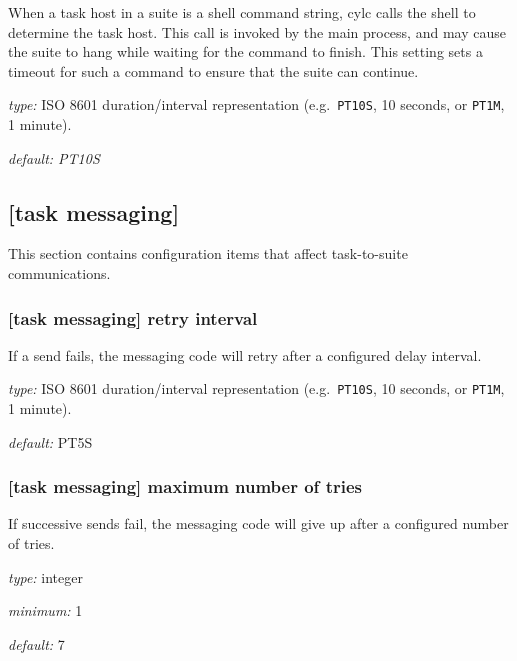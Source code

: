 When a task host in a suite is a shell command string, cylc calls the shell to
determine the task host. This call is invoked by the main process, and may
cause the suite to hang while waiting for the command to finish. This setting
sets a timeout for such a command to ensure that the suite can continue.

\begin{myitemize}
\item {\em type:} ISO 8601 duration/interval representation (e.g.\ 
\lstinline=PT10S=, 10 seconds, or \lstinline=PT1M=, 1 minute).
\item {\em default: PT10S}
\end{myitemize}

\subsection{[task messaging]}

This section contains configuration items that affect task-to-suite
communications.

\subsubsection[retry interval]{[task messaging] \textrightarrow retry interval}

If a send fails, the messaging code will retry after a configured
delay interval.

\begin{myitemize}
\item {\em type:} ISO 8601 duration/interval representation (e.g.\ 
\lstinline=PT10S=, 10 seconds, or \lstinline=PT1M=, 1 minute).
\item {\em default:} PT5S
\end{myitemize}

\subsubsection[maximum number of tries]{[task messaging] \textrightarrow maximum number of tries}

If successive sends fail, the messaging code will give up after a
configured number of tries.

\begin{myitemize}
\item {\em type:} integer
\item {\em minimum:} 1
\item {\em default:} 7
\end{myitemize}

